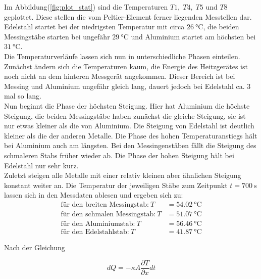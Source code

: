       \noindent Im Abbildung(\ref{fig:plot_stat}) sind die Temperaturen $T1,\; T4,\; T5$ und $T8$ geplottet. Diese stellen die vom Peltier-Element ferner 
      liegenden Messtellen dar. Edelstahl startet bei der niedrigsten Temperatur mit circa $\SI{26}{\celsius}$, die beiden Messingstäbe starten 
      bei ungefähr $\SI{29}{\celsius}$ und Aluminium startet am höchsten bei $\SI{31}{\celsius}$.\\ Die Temperaturverläufe 
      lassen sich nun in unterschiedliche Phasen einteilen. Zunächst ändern sich die Temperaturen kaum, die Energie des 
      Heitzgerätes ist noch nicht an dem hinteren Messgerät angekommen. Dieser Bereich ist bei Messing und 
      Aluminium ungefähr gleich lang, dauert jedoch bei Edelstahl ca. 3 mal so lang.\\ Nun beginnt die Phase der 
      höchsten Steigung. Hier hat Aluminium die höchste Steigung, die beiden Messingstäbe haben zunächst die 
      gleiche Steigung, sie ist nur etwas kleiner als die von Aluminium. Die Steigung von Edelstahl ist 
      deutlich kleiner als die der anderen Metalle. Die Phase des hohen Temperaturanstiegs hält bei Aluminium auch am längsten.
      Bei den Messingenstäben fällt die Steigung des schmaleren Stabs früher wieder ab. Die Phase der hohen Steigung 
      hält bei Edelstahl nur sehr kurz.\\ Zuletzt steigen alle Metalle mit einer relativ kleinen aber ähnlichen Steigung konstant 
      weiter an.
      Die Temperatur der jeweiligen Stäbe zum Zeitpunkt $t=\SI{700}{\second}$ lassen sich in den Messdaten ablesen und ergeben sich zu:
      \begin{align}
        \text{für den breiten Messingstab:} \: T&= \SI{54.02}{\celsius}\\ \label{eqn:M1}
        \text{für den schmalen Messingstab:} \: T&= \SI{51.07}{\celsius}\\ 
        \text{für den Aluminiumstab:} \: T&= \SI{56.46}{\celsius}\\ 
        \text{für den Edelstahlstab:} \: T&= \SI{41.87}{\celsius} \label{eqn:E1}
      \end{align}
    
      \noindent Nach der Gleichung  
      
      \begin{equation}\label{eqn:Wärmemenge}
        dQ = -\kappa A \frac{\partial T}{\partial x}dt 
      \end{equation}
      
